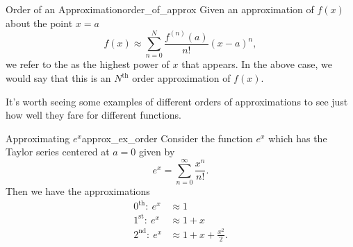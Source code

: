 \begin{df}{Order of an Approximation}{order_of_approx}
Given an approximation of $f(x)$ about the point $x=a$
\[
f(x) \approx \sum_{n=0}^N \frac{f^{(n)}(a)}{n!}(x-a)^n,
\]
we refer to the  as the highest power of $x$ that appears. In the above case, we would say that this is an $N^\textrm{th}$ order approximation of $f(x)$. 
\end{df}

It's worth seeing some examples of different orders of approximations to see just how well they fare for different functions.  

\begin{ex}{Approximating $e^x$}{approx_ex_order}
Consider the function $e^x$ which has the Taylor series centered at $a=0$ given by
\[
e^x = \sum_{n=0}^\infty \frac{x^n}{n!}.
\]
Then we have the approximations
\begin{align*}
    0^\textrm{th}:~e^x&\approx 1\\
    1^\textrm{st}:~e^x&\approx 1+x\\
    2^\textrm{nd}:~e^x&\approx 1+x+\frac{x^2}{2}.
\end{align*}
\end{ex}

